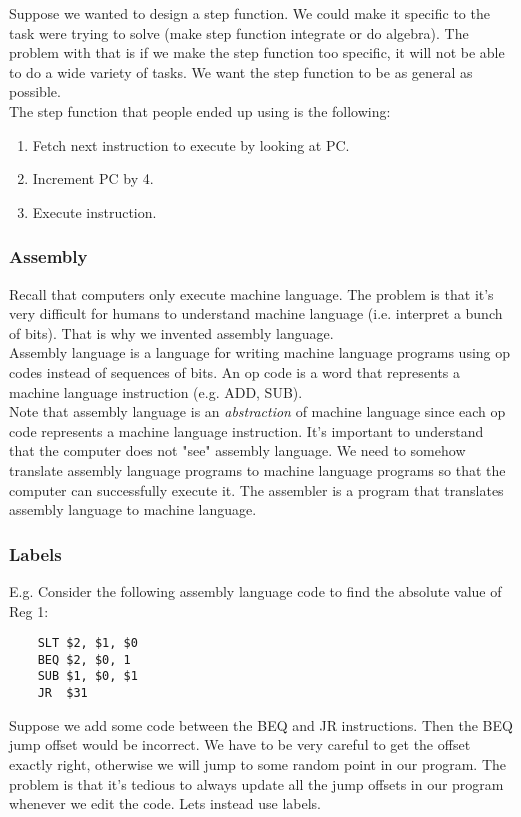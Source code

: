 \documentclass[12pt, letterpaper]{article}
\begin{document}
Suppose we wanted to design a step function. We could make it specific to the task were trying to solve (make step function integrate or do algebra). The problem with that is if we make the step function too specific, it will not be able to do a wide variety of tasks. We want the step function to be as general as possible.\\

The step function that people ended up using is the following:
\begin{enumerate}
\item Fetch next instruction to execute by looking at PC.
\item Increment PC by 4.
\item Execute instruction.
\end{enumerate}

\subsubsection{Assembly}
Recall that computers only execute machine language. The problem is that it's very difficult for humans to understand machine language (i.e. interpret a bunch of bits). That is why we invented assembly language.\\

Assembly language is a language for writing machine language programs using op codes instead of sequences of bits. An op code is a word that represents a machine language instruction (e.g. ADD, SUB).\\

Note that assembly language is an \emph{abstraction} of machine language since each op code represents a machine language instruction. It's important to understand that the computer does not "see" assembly language. We need to somehow translate assembly language programs to machine language programs so that the computer can successfully execute it. The assembler is a program that translates assembly language to machine language. 

\subsubsection{Labels}
E.g. Consider the following assembly language code to find the absolute value of Reg 1:
\begin{verbatim}
	SLT $2, $1, $0
	BEQ $2, $0, 1
	SUB $1, $0, $1
	JR  $31
\end{verbatim}

Suppose we add some code between the BEQ and JR instructions. Then the BEQ jump offset would be incorrect. We have to be very careful to get the offset exactly right, otherwise we will jump to some random point in our program. The problem is that it's tedious to always update all the jump offsets in our program whenever we edit the code. Lets instead use labels.\\
\end{document}
